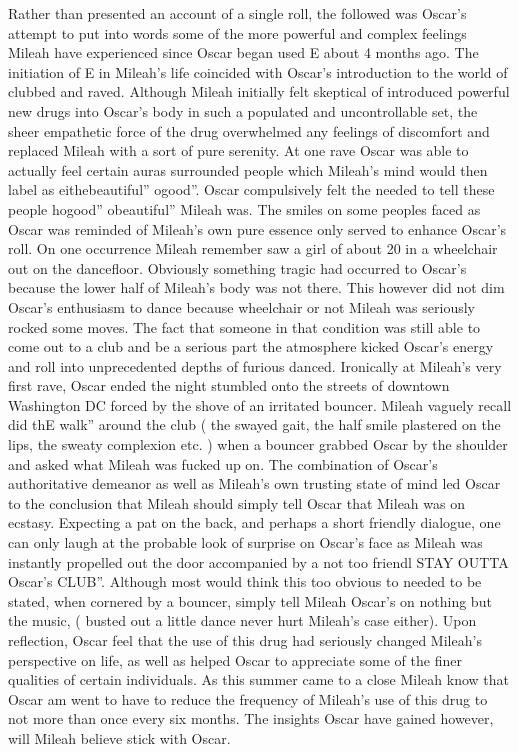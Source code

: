 \documentclass[12pt]{book}
\begin{document}
Rather than presented an account of a single roll, the followed was Oscar's attempt to put into words some of the more powerful and complex feelings Mileah have experienced since Oscar began used E about 4 months ago. The initiation of E in Mileah's life coincided with Oscar's introduction to the world of clubbed and raved. Although Mileah initially felt skeptical of introduced powerful new drugs into Oscar's body in such a populated and uncontrollable set, the sheer empathetic force of the drug overwhelmed any feelings of discomfort and replaced Mileah with a sort of pure serenity. At one rave Oscar was able to actually feel certain auras surrounded people which Mileah's mind would then label as eithebeautiful'' ogood''. Oscar compulsively felt the needed to tell these people hogood'' obeautiful'' Mileah was. The smiles on some peoples faced as Oscar was reminded of Mileah's own pure essence only served to enhance Oscar's roll. On one occurrence Mileah remember saw a girl of about 20 in a wheelchair out on the dancefloor. Obviously something tragic had occurred to Oscar's because the lower half of Mileah's body was not there. This however did not dim Oscar's enthusiasm to dance because wheelchair or not Mileah was seriously rocked some moves. The fact that someone in that condition was still able to come out to a club and be a serious part the atmosphere kicked Oscar's energy and roll into unprecedented depths of furious danced. Ironically at Mileah's very first rave, Oscar ended the night stumbled onto the streets of downtown Washington DC forced by the shove of an irritated bouncer. Mileah vaguely recall did thE walk'' around the club ( the swayed gait, the half smile plastered on the lips, the sweaty complexion etc. ) when a bouncer grabbed Oscar by the shoulder and asked what Mileah was fucked up on. The combination of Oscar's authoritative demeanor as well as Mileah's own trusting state of mind led Oscar to the conclusion that Mileah should simply tell Oscar that Mileah was on ecstasy. Expecting a pat on the back, and perhaps a short friendly dialogue, one can only laugh at the probable look of surprise on Oscar's face as Mileah was instantly propelled out the door accompanied by a not too friendl STAY OUTTA Oscar's CLUB''. Although most would think this too obvious to needed to be stated, when cornered by a bouncer, simply tell Mileah Oscar's on nothing but the music, ( busted out a little dance never hurt Mileah's case either). Upon reflection, Oscar feel that the use of this drug had seriously changed Mileah's perspective on life, as well as helped Oscar to appreciate some of the finer qualities of certain individuals. As this summer came to a close Mileah know that Oscar am went to have to reduce the frequency of Mileah's use of this drug to not more than once every six months. The insights Oscar have gained however, will Mileah believe stick with Oscar.
\end{document}

